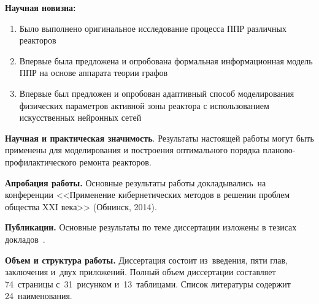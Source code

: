 \textbf{Научная новизна:}
\begin{enumerate}
  \item Было выполнено оригинальное исследование процесса ППР различных реакторов
  \item Впервые была предложена и опробована формальная информационная модель ППР на основе аппарата теории графов
  \item Впервые был предложен и опробован адаптивный способ моделирования физических параметров активной зоны реактора с использованием искусственных нейронных сетей
\end{enumerate}

\textbf{Научная и практическая значимость}.
Результаты настоящей работы могут быть применены для моделирования и построения оптимального порядка планово-профилактического ремонта реакторов. 


\textbf{Апробация работы.}
Основные результаты работы докладывались~на конференции <<Применение кибернетических методов в решении проблем общества XXI века>> (Обнинск, 2014).


\textbf{Публикации.} Основные результаты по теме диссертации изложены в тезисах докладов~\cite{conf-iate-2014}.

\textbf{Объем и структура работы.} Диссертация состоит из~введения, пяти глав, заключения и~двух приложений.
Полный объем диссертации составляет 74~страницы с~31~рисунком и~13~таблицами. Список литературы содержит 24~наименования.

\clearpage